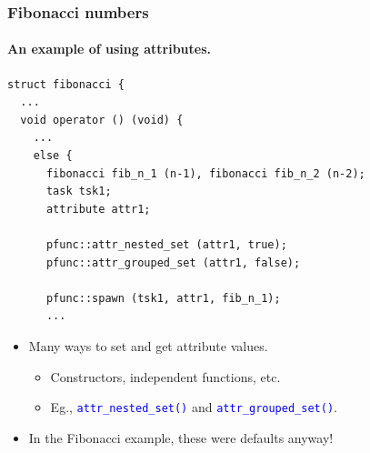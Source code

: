 \documentclass{beamer}
\newcommand{\func}[1]{\lstinline[basicstyle=\sffamily]{#1()}}
\begin{document}
\begin{frame}[fragile]
\frametitle{Fibonacci numbers}
\framesubtitle{An example of using attributes.}
\begin{center}
\begin{minipage}{0.5\textwidth}
\begin{lstlisting}
struct fibonacci {
  ...
  void operator () (void) {
    ...
    else {
      fibonacci fib_n_1 (n-1), fibonacci fib_n_2 (n-2);
      task tsk1;
      attribute attr1;
      
      pfunc::attr_nested_set (attr1, true);
      pfunc::attr_grouped_set (attr1, false);

      pfunc::spawn (tsk1, attr1, fib_n_1);
      ...
\end{lstlisting}
\end{minipage}
\end{center}
\begin{itemize}
\item Many ways to set and get attribute values.
  \begin{itemize}
  \item Constructors, independent functions, etc.
  \item Eg., \textcolor{blue}{\func{attr_nested_set}} and
        \textcolor{blue}{\func{attr_grouped_set}}.
  \end{itemize}
\item In the Fibonacci example, these were defaults anyway!
\end{itemize}
\end{frame}
\end{document}
